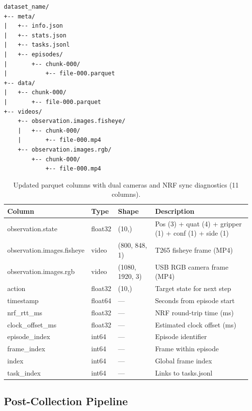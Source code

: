 \documentclass[11pt,a4paper]{article}
\begin{document}
\begin{lstlisting}[basicstyle=\small\ttfamily, frame=single, numbers=none]
dataset_name/
+-- meta/
|   +-- info.json
|   +-- stats.json
|   +-- tasks.jsonl
|   +-- episodes/
|       +-- chunk-000/
|           +-- file-000.parquet
+-- data/
|   +-- chunk-000/
|       +-- file-000.parquet
+-- videos/
    +-- observation.images.fisheye/
    |   +-- chunk-000/
    |       +-- file-000.mp4
    +-- observation.images.rgb/
        +-- chunk-000/
            +-- file-000.mp4
\end{lstlisting}

\begin{table}[htbp]
\centering
\caption{Updated parquet columns with dual cameras and NRF sync diagnostics (11 columns).}
\small
\begin{tabular}{l l l l}
\toprule
\textbf{Column} & \textbf{Type} & \textbf{Shape} & \textbf{Description} \\
\midrule
observation.state & float32 & (10,) & Pos (3) + quat (4) + gripper (1) + conf (1) + side (1) \\
observation.images.fisheye & video & (800, 848, 1) & T265 fisheye frame (MP4) \\
observation.images.rgb & video & (1080, 1920, 3) & USB RGB camera frame (MP4) \\
action & float32 & (10,) & Target state for next step \\
timestamp & float64 & --- & Seconds from episode start \\
nrf\_rtt\_ms & float32 & --- & NRF round-trip time (ms) \\
clock\_offset\_ms & float32 & --- & Estimated clock offset (ms) \\
episode\_index & int64 & --- & Episode identifier \\
frame\_index & int64 & --- & Frame within episode \\
index & int64 & --- & Global frame index \\
task\_index & int64 & --- & Links to tasks.jsonl \\
\bottomrule
\end{tabular}
\label{tab:parquet-columns}
\end{table}

\subsection{Post-Collection Pipeline}
\end{document}
